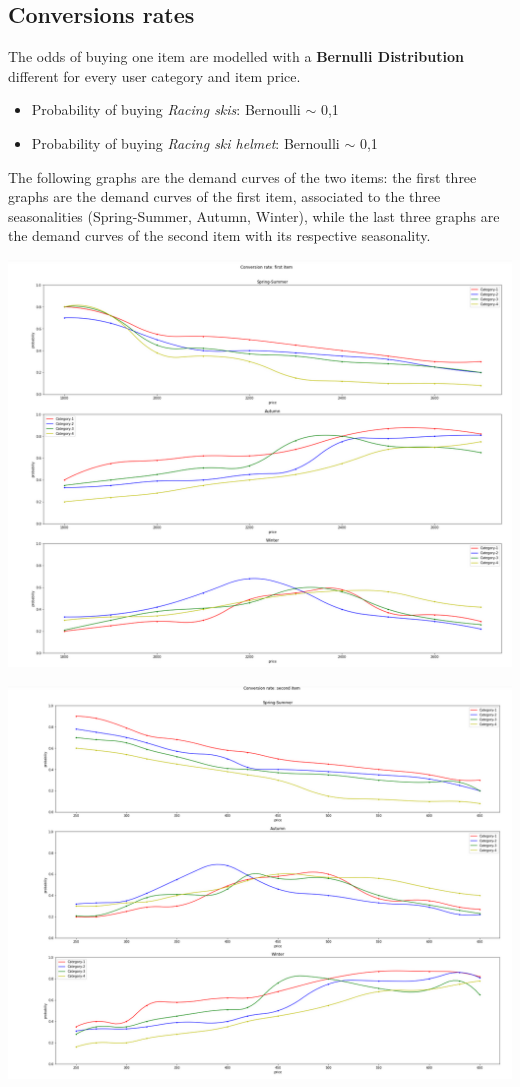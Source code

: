 \subsection*{Conversions rates}
The odds of buying one item are modelled with a \textbf{Bernulli Distribution} different for every user category and item price. 
\begin{itemize}
	\item Probability of buying \textit{Racing skis}: Bernoulli $\sim$ 0,1
	\item Probability of buying \textit{Racing ski helmet}: Bernoulli $\sim$ 0,1
\end{itemize}
The following graphs are the demand curves of the two items: the first three graphs are the demand curves of the first item, associated to the three seasonalities (Spring-Summer, Autumn, Winter), while the last three graphs are the demand curves of the second item with its respective seasonality.
\begin{center}
	\includegraphics[scale=0.5]{Images/CR_fstItem}
\end{center}

\begin{center}
	\includegraphics[scale=0.5]{Images/CR_scndItem}
\end{center}

